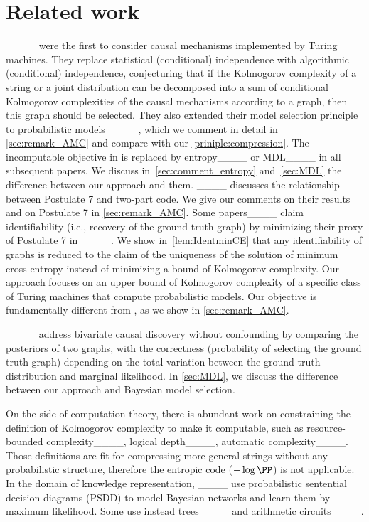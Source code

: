 \section{Related work}
\label{sec:related_work}
%
____ were the first to consider causal mechanisms implemented by Turing machines. They replace statistical (conditional) independence with algorithmic (conditional) independence, conjecturing that if the Kolmogorov complexity of a string or a joint distribution can be decomposed into a sum of conditional Kolmogorov complexities of the causal mechanisms according to a graph, then this graph should be selected. They also extended their model selection principle to probabilistic models ____, which we comment in detail in \cref{sec:remark_AMC} and compare with our \cref{priniple:compression}.
%
The incomputable objective in \cite[Postulate 7]{janzing2010causal} is replaced by entropy____ or MDL____ in all subsequent papers. We discuss in~\cref{sec:comment_entropy} and~\cref{sec:MDL} the difference between our approach and them.
____ discusses the relationship between Postulate 7 and two-part code. We give our comments on their results and on Postulate 7 in \cref{sec:remark_AMC}.
Some papers____ claim identifiability (i.e., recovery of the ground-truth graph) by minimizing their proxy of Postulate 7 in ____. We show in~\cref{lem:IdentminCE} that any identifiability of graphs is reduced to the claim of the uniqueness of the solution of minimum cross-entropy instead of minimizing a bound of Kolmogorov complexity. Our approach focuses on an upper bound of Kolmogorov complexity of a specific class of Turing machines that compute probabilistic models. Our objective is fundamentally different from \cite[Postulate 7]{janzing2010causal}, as we show in \cref{sec:remark_AMC}.

%


%

%
%
____ address bivariate causal discovery without confounding by comparing the posteriors of two graphs, with the correctness (probability of selecting the ground truth graph) depending on the total variation between the ground-truth distribution and marginal likelihood. In \cref{sec:MDL}, we discuss the difference between our approach and Bayesian model selection.

On the side of computation theory, there is abundant work on constraining the definition of Kolmogorov complexity to make it computable, such as 
%
resource-bounded complexity____, logical depth____, automatic complexity____.%
Those definitions are fit for compressing more general strings without any probabilistic structure, therefore the entropic code ($-\log \PP$) is not applicable. 
%
In the domain of knowledge representation, ____ use probabilistic sentential decision diagrams (PSDD) to model Bayesian networks and learn them by maximum likelihood. Some use instead trees____ and arithmetic circuits____.

%